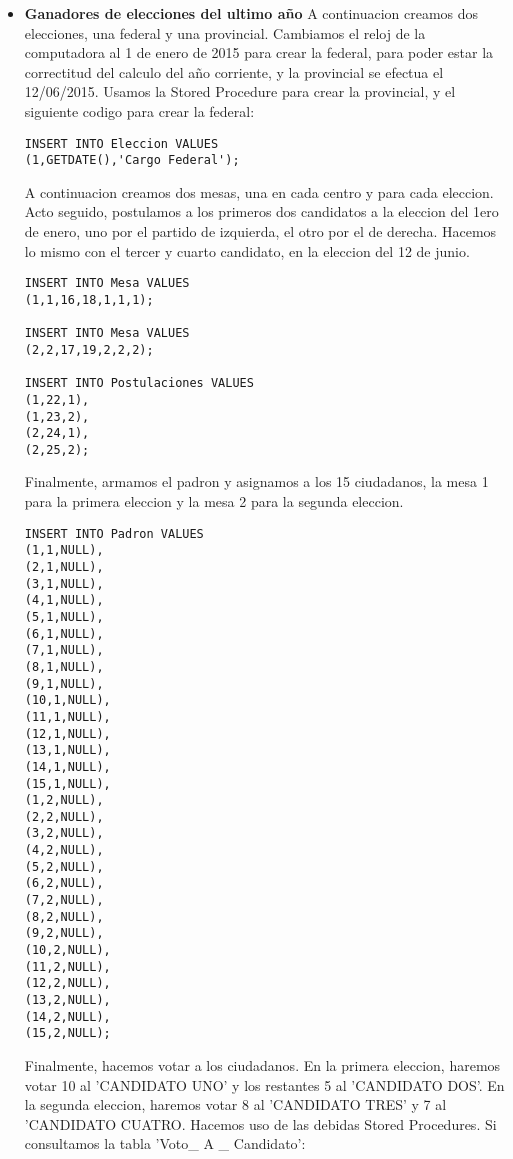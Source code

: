 \begin{itemize}
\item \textbf{Ganadores de elecciones del ultimo año}
A continuacion creamos dos elecciones, una federal y una provincial. Cambiamos el reloj de la computadora al 1 de enero de 2015 para crear la federal, para poder estar la correctitud del calculo del año corriente, y la provincial se efectua el 12/06/2015. Usamos la Stored Procedure para crear la provincial, y el siguiente codigo para crear la federal:

\begin{lstlisting}
INSERT INTO Eleccion VALUES
(1,GETDATE(),'Cargo Federal');
\end{lstlisting}


A continuacion creamos dos mesas, una en cada centro y para cada eleccion. Acto seguido, postulamos a los primeros dos candidatos a la eleccion del 1ero de enero, uno por el partido de izquierda, el otro por el de derecha. Hacemos lo mismo con el tercer y cuarto candidato, en la eleccion del 12 de junio.

\begin{lstlisting}
INSERT INTO Mesa VALUES
(1,1,16,18,1,1,1);

INSERT INTO Mesa VALUES
(2,2,17,19,2,2,2);

INSERT INTO Postulaciones VALUES
(1,22,1),
(1,23,2),
(2,24,1),
(2,25,2);
\end{lstlisting}

Finalmente, armamos el padron y asignamos a los 15 ciudadanos, la mesa 1 para la primera eleccion y la mesa 2 para la segunda eleccion.

\begin{lstlisting}
INSERT INTO Padron VALUES
(1,1,NULL),
(2,1,NULL),
(3,1,NULL),
(4,1,NULL),
(5,1,NULL),
(6,1,NULL),
(7,1,NULL),
(8,1,NULL),
(9,1,NULL),
(10,1,NULL),
(11,1,NULL),
(12,1,NULL),
(13,1,NULL),
(14,1,NULL),
(15,1,NULL),
(1,2,NULL),
(2,2,NULL),
(3,2,NULL),
(4,2,NULL),
(5,2,NULL),
(6,2,NULL),
(7,2,NULL),
(8,2,NULL),
(9,2,NULL),
(10,2,NULL),
(11,2,NULL),
(12,2,NULL),
(13,2,NULL),
(14,2,NULL),
(15,2,NULL);
\end{lstlisting}

Finalmente, hacemos votar a los ciudadanos. En la primera eleccion, haremos votar 10 al 'CANDIDATO UNO' y los restantes 5 al 'CANDIDATO DOS'. En la segunda eleccion, haremos votar 8 al 'CANDIDATO TRES' y 7 al 'CANDIDATO CUATRO. Hacemos uso de las debidas Stored Procedures. Si consultamos la tabla 'Voto\_ A \_ Candidato':


\end{itemize}
